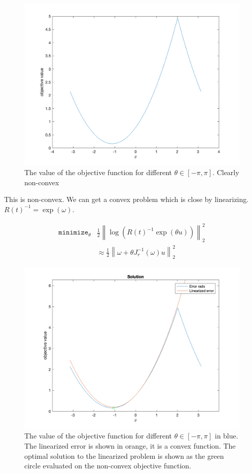 \documentclass[11pt]{article}
\newcommand{\norm}[1]{\left\lVert#1\right\rVert}
\begin{document}
\begin{figure}[H]
	\centering
	\includegraphics[width=\textwidth]{../matlab/objective_function.png}
	\caption{The value of the objective function for different $\theta \in [-\pi, \pi]$. Clearly non-convex}
\end{figure}

This is non-convex. We can get a convex problem which is close by linearizing. $R(t)^{-1} = \exp(\omega)$.

\begin{align}
\texttt{minimize}_\theta& \frac{1}{2}\norm{\log\left(R(t)^{-1}\exp(\theta u)\right)}_2^2\\
&\approx \frac{1}{2}\norm{\omega + \theta J_r^{-1}(\omega)u}_2^2
\end{align}

\begin{figure}[H]
	\centering
	\includegraphics[width=\textwidth]{../matlab/linearized_solution.png}
	\caption{The value of the objective function for different $\theta \in [-\pi, \pi]$ in blue. The linearized error is shown in orange, it is a convex function. The optimal solution to the linearized problem is shown as the green circle evaluated on the non-convex objective function.}
\end{figure}
\end{document}
